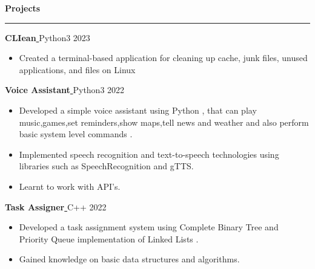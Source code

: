 \documentclass{article}
\begin{document}
\hypersetup{hidelinks,colorlinks,urlcolor=black} 
\vspace*{1cm}
\fontsize{15}{14}
\faLaptop\vspace*{0.1cm}\textbf{\Large{Projects}}\par
\rule{\linewidth}{0.5pt}
\fontsize{10}{14}
\vspace*{0.25cm}\par\textbf{CLIean}\href{https://github.com/codit04/CLIean} { \faGithubSquare}{\textbar}\fontsize{3}{14}Python3 \hfill\fontsize{8}{14}2023\par
\fontsize{10}{14}
\begin{itemize} %
    \item  Created a terminal-based application for cleaning up cache, junk files, unused applications, and files on Linux 
\end{itemize}
\vspace*{0.25cm}\par\textbf{Voice Assistant}\href{https://github.com/codit04/Voice-Assistant-with-python} { \faGithubSquare}{\textbar}\fontsize{3}{14}Python3 \hfill\fontsize{8}{14}2022\par
\fontsize{10}{14}
\begin{itemize} %
    \item Developed a simple voice assistant using Python , that can play music,games,set reminders,show maps,tell news and weather and also
    perform basic system level commands . 
    \item Implemented speech recognition and text-to-speech technologies using libraries such as SpeechRecognition and gTTS.
    \item Learnt to work with API's.
\end{itemize}
\vspace*{0.25cm}\par\textbf{Task Assigner}\href{https://github.com/codit04/Task-Assigner}{ \faGithubSquare}{\textbar}\fontsize{3}{14}C++ \hfill\fontsize{8}{14}2022\par
\fontsize{10}{14}
\begin{itemize}
    \item Developed a task assignment system using Complete Binary Tree and Priority Queue implementation of Linked Lists .
    \item Gained knowledge on basic data structures and algorithms.
\end{itemize}

\end{document}
